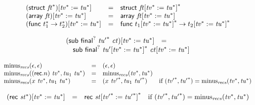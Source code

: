 $$
\begin{array}[t]{@{}lcl@{}l@{}}
{(\mathsf{struct}~{{\mathit{ft}}^\ast})}{{}[ {{\mathit{tv}}^\ast} := {{\mathit{tu}}^\ast} ]} & = & \mathsf{struct}~{{{\mathit{ft}}}{{}[ {{\mathit{tv}}^\ast} := {{\mathit{tu}}^\ast} ]}^\ast} \\
{(\mathsf{array}~{\mathit{ft}})}{{}[ {{\mathit{tv}}^\ast} := {{\mathit{tu}}^\ast} ]} & = & \mathsf{array}~{{\mathit{ft}}}{{}[ {{\mathit{tv}}^\ast} := {{\mathit{tu}}^\ast} ]} \\
{(\mathsf{func}~{t_1^\ast} \rightarrow {t_2^\ast})}{{}[ {{\mathit{tv}}^\ast} := {{\mathit{tu}}^\ast} ]} & = & \mathsf{func}~{{t_1}{{}[ {{\mathit{tv}}^\ast} := {{\mathit{tu}}^\ast} ]}^\ast} \rightarrow {{t_2}{{}[ {{\mathit{tv}}^\ast} := {{\mathit{tu}}^\ast} ]}^\ast} \\
\end{array}
$$

$$
\begin{array}[t]{@{}lcl@{}l@{}}
{(\mathsf{sub}~{\mathsf{final}^?}~{{\mathit{tu}'}^\ast}~{\mathit{ct}})}{{}[ {{\mathit{tv}}^\ast} := {{\mathit{tu}}^\ast} ]} & = & & \\
 \multicolumn{4}{@{}l@{}}{\quad
\begin{array}[t]{@{}l@{}}
\mathsf{sub}~{\mathsf{final}^?}~{{{\mathit{tu}'}}{{}[ {{\mathit{tv}}^\ast} := {{\mathit{tu}}^\ast} ]}^\ast}~{{\mathit{ct}}}{{}[ {{\mathit{tv}}^\ast} := {{\mathit{tu}}^\ast} ]} \\
\end{array}
} \\
\end{array}
$$

$$
\begin{array}[t]{@{}lcl@{}l@{}}
{\mathrm{minus}}_{\mathit{recs}}(\epsilon, \epsilon) & = & (\epsilon, \epsilon) \\
{\mathrm{minus}}_{\mathit{recs}}((\mathsf{rec} {.} n)~{{\mathit{tv}}^\ast}, {\mathit{tu}}_1~{{\mathit{tu}}^\ast}) & = & {\mathrm{minus}}_{\mathit{recs}}({{\mathit{tv}}^\ast}, {{\mathit{tu}}^\ast}) \\
{\mathrm{minus}}_{\mathit{recs}}(x~{{\mathit{tv}}^\ast}, {\mathit{tu}}_1~{{\mathit{tu}}^\ast}) & = & (x~{{\mathit{tv}'}^\ast}, {\mathit{tu}}_1~{{\mathit{tu}'}^\ast}) & \quad \mbox{if}~ ({{\mathit{tv}'}^\ast}, {{\mathit{tu}'}^\ast}) = {\mathrm{minus}}_{\mathit{recs}}({{\mathit{tv}}^\ast}, {{\mathit{tu}}^\ast}) \\
\end{array}
$$

$$
\begin{array}[t]{@{}lcl@{}l@{}}
{(\mathsf{rec}~{{\mathit{st}}^\ast})}{{}[ {{\mathit{tv}}^\ast} := {{\mathit{tu}}^\ast} ]} & = & \mathsf{rec}~{{{\mathit{st}}}{{}[ {{\mathit{tv}'}^\ast} := {{\mathit{tu}'}^\ast} ]}^\ast} & \quad \mbox{if}~ ({{\mathit{tv}'}^\ast}, {{\mathit{tu}'}^\ast}) = {\mathrm{minus}}_{\mathit{recs}}({{\mathit{tv}}^\ast}, {{\mathit{tu}}^\ast}) \\
\end{array}
$$

